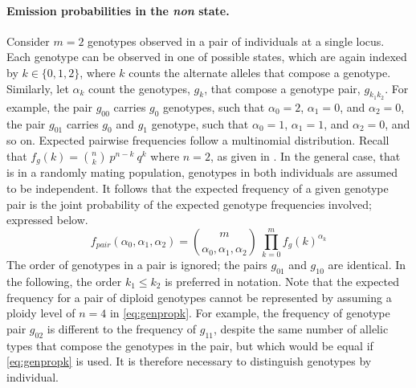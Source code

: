 \paragraph{Emission probabilities in the \emph{non} state.}
Consider $m=2$ genotypes observed in a pair of individuals at a single locus.
Each genotype can be observed in one of  possible states, which are again indexed by ${k \in \lbrace 0,1,2 \rbrace}$, where $k$ counts the alternate alleles that compose a genotype.
Similarly, let $\alpha_{k}$ count the genotypes, $g_{k}$, that compose a genotype pair, ${g_{k_{1} k_{2}}}$.
For example, the pair ${g_{0 0}}$ carries  $g_0$ genotypes, such that ${\alpha_{0} = 2}$, ${\alpha_{1} = 0}$, and ${\alpha_{2} = 0}$, the pair ${g_{0 1}}$ carries  $g_0$ and  $g_1$ genotype, such that ${\alpha_{0} = 1}$, ${\alpha_{1} = 1}$, and ${\alpha_{2} = 0}$, and so on.
Expected pairwise frequencies follow a multinomial distribution.
Recall that ${f_{g}(k) = {{n}\choose{k}}~p^{n-k}~q^{k}}$ where ${n=2}$, as given in .
In the general case, that is in a randomly mating population, genotypes in both individuals are assumed to be independent.
It follows that the expected frequency of a given genotype pair is the joint probability of the expected genotype frequencies involved; expressed below.
\begin{equation}\label{eq:genpairalpha}
	f_\textit{pair}(\alpha_{0}, \alpha_{1}, \alpha_{2}) = {{m}\choose{\alpha_{0}, \alpha_{1}, \alpha_{2}}}~\prod_{k=0}^{m} f_{g}(k)^{\alpha_{k}}
\end{equation}
The order of genotypes in a pair is ignored; \eg the pairs ${g_{01}}$ and ${g_{10}}$ are identical.
In the following, the order ${k_1 \leq k_2}$ is preferred in notation.
Note that the expected frequency for a pair of diploid genotypes cannot be represented by assuming a ploidy level of ${n=4}$ in \cref{eq:genpropk}.
For example, the frequency of genotype pair ${g_{02}}$ is different to the frequency of ${g_{11}}$, despite the same number of allelic types that compose the genotypes in the pair, but which would be equal if \cref{eq:genpropk} is used.
It is therefore necessary to distinguish genotypes by individual.


